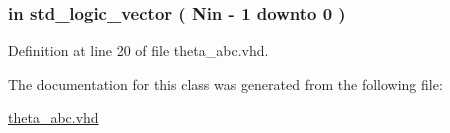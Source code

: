 \hypertarget{classtheta__abc_aa0a6389197d6e4203cf6b365fbe2e2d1}{}
\subsubsection[{theta\+\_\+in}]{ {\bfseries \textcolor{keywordflow}{in}\textcolor{vhdlchar}{ }} {\bfseries \textcolor{comment}{std\+\_\+logic\+\_\+vector}\textcolor{vhdlchar}{ }\textcolor{vhdlchar}{(}\textcolor{vhdlchar}{ }\textcolor{vhdlchar}{ }\textcolor{vhdlchar}{ }\textcolor{vhdlchar}{ }{\bfseries {\bf Nin}} \textcolor{vhdlchar}{-\/}\textcolor{vhdlchar}{ } \textcolor{vhdldigit}{1} \textcolor{vhdlchar}{ }\textcolor{keywordflow}{downto}\textcolor{vhdlchar}{ }\textcolor{vhdlchar}{ } \textcolor{vhdldigit}{0} \textcolor{vhdlchar}{ }\textcolor{vhdlchar}{)}\textcolor{vhdlchar}{ }} \hspace{0.3cm}{\ttfamily [Port]}}\label{classtheta__abc_aa0a6389197d6e4203cf6b365fbe2e2d1}


Definition at line 20 of file theta\+\_\+abc.\+vhd.



The documentation for this class was generated from the following file\+:\begin{DoxyCompactItemize}
\item 
\hyperlink{theta__abc_8vhd}{theta\+\_\+abc.\+vhd}\end{DoxyCompactItemize}
